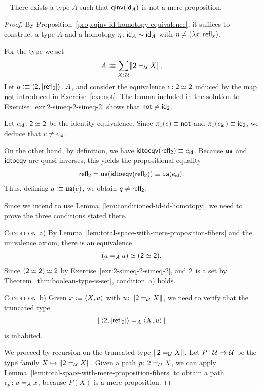 \begin{thm}\fe\ \ua\label{thm:qinv-is-not-mere-proposition}
    There exists a type\/ $A$ such that\/ $\mathsf{qinv}(\mathsf{id}_A)$ is not a mere proposition. 
\end{thm}

\begin{proof}
    By Proposition~\ref{prop:qinv-id-homotopy-equivalence}, it suffices to construct a type $A$ and a homotopy $\eta\colon\id_A\sim\id_A$ with $\eta\ne(\lambda x.\,\mathsf{refl}_x)$.

    For the type we set
    \[
        A\defeq\sum_{X\colon\univ}\lVert\fun2\eq\univ X\rVert.
    \]
    Let $a\defeq\dep{\fun2,\lvert\fun{refl}_{\fun2}\rvert}\colon A$, and consider the equivalence $e\colon\fun2\simeq\fun2$ induced by the map $\mathsf{not}$ introduced in Exercise~\ref{exr:not}. The lemma included in the solution to Exercise~\ref{exr:2-simeq-2-simeq-2} shows that $\mathsf{not}\ne\mathsf{id}_{\mathsf{2}}$.
    
    Let $e_{\id}\colon\fun2\simeq\fun2$ be the identity equivalence. Since $\pi_1(e)\equiv\mathsf{not}$ and $\pi_1(e_{\mathsf{id}})\equiv\mathsf{id}_{\mathsf{2}}$, we deduce that $e\ne e_{\mathsf{id}}$.
    
    On the other hand, by definition, we have $\mathsf{idtoeqv}(\mathsf{refl}_{\mathsf{2}})\equiv e_{\mathsf{id}}$. Because $\mathsf{ua}$ and $\mathsf{idtoeqv}$ are quasi-inverses, this yields the propositional equality
    \[
        \mathsf{refl}_{\mathsf{2}}\mathrel{=_{}}\mathsf{ua}(\mathsf{idtoeqv}(\mathsf{refl}_{\mathsf{2}}))\equiv\mathsf{ua}(e_{\mathsf{id}}).
    \]
    Thus, defining $q\mathrel{\vcentcolon}\equiv\mathsf{ua}(e)$, we obtain $q\ne\mathsf{refl}_{\mathsf{2}}$.

    Since we intend to use Lemma~\ref{lem:conditioned-id-id-homotopy}, we need to prove the three conditions stated there.

    \textsc{Condition}~a)
    By Lemma~\ref{lem:total-space-with-mere-proposition-fibers} and the univalence axiom, there is an equivalence
    \[
        (a\mathrel{=_{A}}a)\simeq(\mathsf{2}\simeq\mathsf{2}).
    \]
    Since $(\mathsf{2}\simeq\mathsf{2})\simeq\mathsf{2}$ by Exercise~\ref{exr:2-simeq-2-simeq-2}, and $\mathsf{2}$ is a set by Theorem~\ref{thm:boolean-type-is-set}, condition~a) holds.

    \textsc{Condition}~b) Given $x\mathrel{\vcentcolon}\equiv\langle X,u\rangle$ with $u\colon\lVert\fun2\eq\univ X\rVert$, we need to verify that the truncated type
    \[
        \lVert\langle\mathsf{2},\lvert\mathsf{refl}_{\mathsf{2}}\rvert\rangle
        \mathrel{=_{A}}\langle X,u\rangle\rVert
    \]
    is inhabited.
    
    We proceed by recursion on the truncated type $\lVert\mathsf{2}\mathrel{=_{\mathcal U}} X\rVert$. Let $P\colon\univ\to\univ$ be the type family $X\mapsto\lVert\mathsf{2}\mathrel{=_{\mathcal U}} X\rVert$. Given a path $p\colon\fun2\eq\univ X$, we can apply Lemma~\ref{lem:total-space-with-mere-proposition-fibers} to obtain a path $\epsilon_p\colon a\eq Ax$, because $P(X)$ is a mere proposition.
    

\end{proof}

